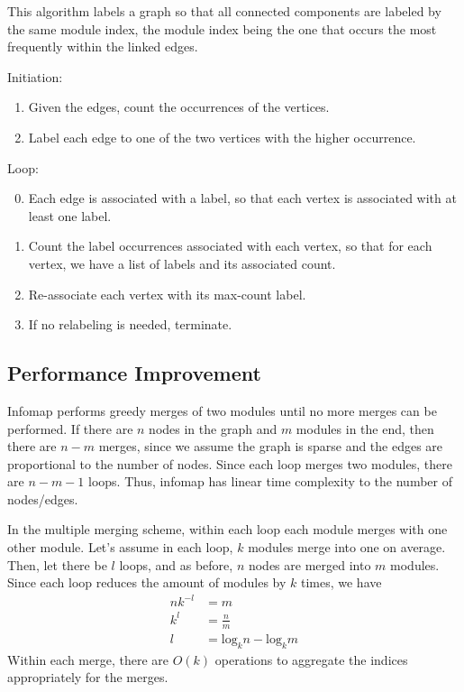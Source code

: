 \documentclass[12pt,a4paper]{article}
\begin{document}
This algorithm labels a graph so that all connected components are labeled by the same module index, the module index being the one that occurs the most frequently within the linked edges.

Initiation:
\begin{enumerate}
    \item Given the edges, count the occurrences of the vertices.
    \item Label each edge to one of the two vertices with the higher occurrence.
\end{enumerate}

Loop:
\begin{enumerate}
    \setcounter{enumi}{-1}
    \item Each edge is associated with a label, so that each vertex is associated with at least one label.
    \item Count the label occurrences associated with each vertex, so that for each vertex, we have a list of labels and its associated count.
    \item Re-associate each vertex with its max-count label.
    \item If no relabeling is needed, terminate.
\end{enumerate}

\subsection{Performance Improvement}

Infomap performs greedy merges of two modules until no more merges can be performed. If there are \(n\) nodes in the graph and \(m\) modules in the end, then there are \(n-m\) merges, since we assume the graph is sparse and the edges are proportional to the number of nodes. Since each loop merges two modules, there are \(n-m-1\) loops. Thus, infomap has linear time complexity to the number of nodes/edges.

In the multiple merging scheme, within each loop each module merges with one other module. Let's assume in each loop, \(k\) modules merge into one on average. Then, let there be \(l\) loops, and as before, \(n\) nodes are merged into \(m\) modules. Since each loop reduces the amount of modules by \(k\) times, we have
\begin{align}
    n k^{-l} &= m \\
    k^l &= \frac{n}{m} \\
    l &= \mathrm{log}_k n -\mathrm{log}_k m
\end{align}
Within each merge, there are \(O(k)\) operations to aggregate the indices appropriately for the merges.
\end{document}
